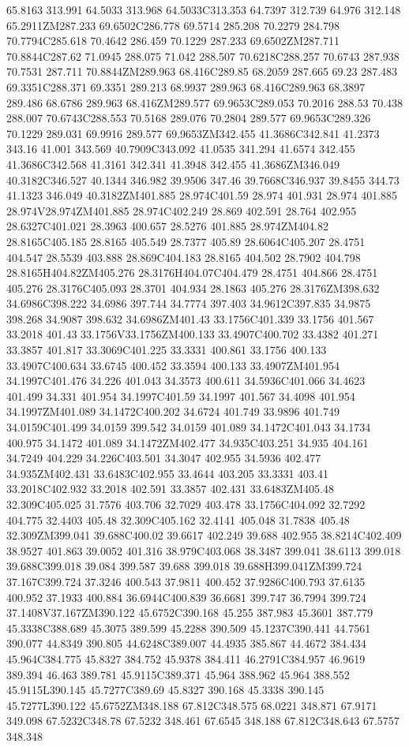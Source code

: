 65.8163 313.991 64.5033 313.968 64.5033C313.353 64.7397 312.739 64.976 312.148 65.2911ZM287.233 69.6502C286.778 69.5714 285.208 70.2279 284.798 70.7794C285.618 70.4642 286.459 70.1229 287.233 69.6502ZM287.711 70.8844C287.62 71.0945 288.075 71.042 288.507 70.6218C288.257 70.6743 287.938 70.7531 287.711 70.8844ZM289.963 68.416C289.85 68.2059 287.665 69.23 287.483 69.3351C288.371 69.3351 289.213 68.9937 289.963 68.416C289.963 68.3897 289.486 68.6786 289.963 68.416ZM289.577 69.9653C289.053 70.2016 288.53 70.438 288.007 70.6743C288.553 70.5168 289.076 70.2804 289.577 69.9653C289.326 70.1229 289.031 69.9916 289.577 69.9653ZM342.455 41.3686C342.841 41.2373 343.16 41.001 343.569 40.7909C343.092 41.0535 341.294 41.6574 342.455 41.3686C342.568 41.3161 342.341 41.3948 342.455 41.3686ZM346.049 40.3182C346.527 40.1344 346.982 39.9506 347.46 39.7668C346.937 39.8455 344.73 41.1323 346.049 40.3182ZM401.885 28.974C401.59 28.974 401.931 28.974 401.885 28.974V28.974ZM401.885 28.974C402.249 28.869 402.591 28.764 402.955 28.6327C401.021 28.3963 400.657 28.5276 401.885 28.974ZM404.82 28.8165C405.185 28.8165 405.549 28.7377 405.89 28.6064C405.207 28.4751 404.547 28.5539 403.888 28.869C404.183 28.8165 404.502 28.7902 404.798 28.8165H404.82ZM405.276 28.3176H404.07C404.479 28.4751 404.866 28.4751 405.276 28.3176C405.093 28.3701 404.934 28.1863 405.276 28.3176ZM398.632 34.6986C398.222 34.6986 397.744 34.7774 397.403 34.9612C397.835 34.9875 398.268 34.9087 398.632 34.6986ZM401.43 33.1756C401.339 33.1756 401.567 33.2018 401.43 33.1756V33.1756ZM400.133 33.4907C400.702 33.4382 401.271 33.3857 401.817 33.3069C401.225 33.3331 400.861 33.1756 400.133 33.4907C400.634 33.6745 400.452 33.3594 400.133 33.4907ZM401.954 34.1997C401.476 34.226 401.043 34.3573 400.611 34.5936C401.066 34.4623 401.499 34.331 401.954 34.1997C401.59 34.1997 401.567 34.4098 401.954 34.1997ZM401.089 34.1472C400.202 34.6724 401.749 33.9896 401.749 34.0159C401.499 34.0159 399.542 34.0159 401.089 34.1472C401.043 34.1734 400.975 34.1472 401.089 34.1472ZM402.477 34.935C403.251 34.935 404.161 34.7249 404.229 34.226C403.501 34.3047 402.955 34.5936 402.477 34.935ZM402.431 33.6483C402.955 33.4644 403.205 33.3331 403.41 33.2018C402.932 33.2018 402.591 33.3857 402.431 33.6483ZM405.48 32.309C405.025 31.7576 403.706 32.7029 403.478 33.1756C404.092 32.7292 404.775 32.4403 405.48 32.309C405.162 32.4141 405.048 31.7838 405.48 32.309ZM399.041 39.688C400.02 39.6617 402.249 39.688 402.955 38.8214C402.409 38.9527 401.863 39.0052 401.316 38.979C403.068 38.3487 399.041 38.6113 399.018 39.688C399.018 39.084 399.587 39.688 399.018 39.688H399.041ZM399.724 37.167C399.724 37.3246 400.543 37.9811 400.452 37.9286C400.793 37.6135 400.952 37.1933 400.884 36.6944C400.839 36.6681 399.747 36.7994 399.724 37.1408V37.167ZM390.122 45.6752C390.168 45.255 387.983 45.3601 387.779 45.3338C388.689 45.3075 389.599 45.2288 390.509 45.1237C390.441 44.7561 390.077 44.8349 390.805 44.6248C389.007 44.4935 385.867 44.4672 384.434 45.964C384.775 45.8327 384.752 45.9378 384.411 46.2791C384.957 46.9619 389.394 46.463 389.781 45.9115C389.371 45.964 388.962 45.964 388.552 45.9115L390.145 45.7277C389.69 45.8327 390.168 45.3338 390.145 45.7277L390.122 45.6752ZM348.188 67.812C348.575 68.0221 348.871 67.9171 349.098 67.5232C348.78 67.5232 348.461 67.6545 348.188 67.812C348.643 67.5757 348.348 